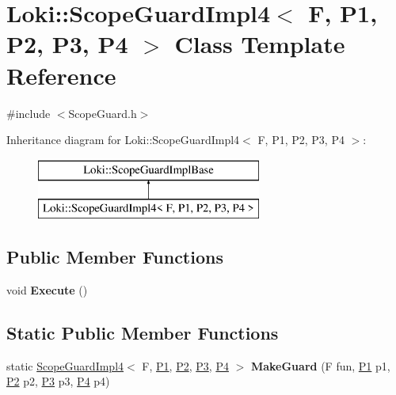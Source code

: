 \hypertarget{classLoki_1_1ScopeGuardImpl4}{}\section{Loki\+:\+:Scope\+Guard\+Impl4$<$ F, P1, P2, P3, P4 $>$ Class Template Reference}
\label{classLoki_1_1ScopeGuardImpl4}


{\ttfamily \#include $<$Scope\+Guard.\+h$>$}

Inheritance diagram for Loki\+:\+:Scope\+Guard\+Impl4$<$ F, P1, P2, P3, P4 $>$\+:\begin{figure}[H]
\begin{center}
\leavevmode
\includegraphics[height=2.000000cm]{classLoki_1_1ScopeGuardImpl4}
\end{center}
\end{figure}
\subsection*{Public Member Functions}
\begin{DoxyCompactItemize}
\item 
\hypertarget{classLoki_1_1ScopeGuardImpl4_afda12fe2bea582332b670df2ca454acc}{}void {\bfseries Execute} ()\label{classLoki_1_1ScopeGuardImpl4_afda12fe2bea582332b670df2ca454acc}

\end{DoxyCompactItemize}
\subsection*{Static Public Member Functions}
\begin{DoxyCompactItemize}
\item 
\hypertarget{classLoki_1_1ScopeGuardImpl4_a71b82547f38ed4d037e6f5866d5d7cda}{}static \hyperlink{classLoki_1_1ScopeGuardImpl4}{Scope\+Guard\+Impl4}$<$ F, \hyperlink{structP1}{P1}, \hyperlink{structP2}{P2}, \hyperlink{structP3}{P3}, \hyperlink{structP4}{P4} $>$ {\bfseries Make\+Guard} (F fun, \hyperlink{structP1}{P1} p1, \hyperlink{structP2}{P2} p2, \hyperlink{structP3}{P3} p3, \hyperlink{structP4}{P4} p4)\label{classLoki_1_1ScopeGuardImpl4_a71b82547f38ed4d037e6f5866d5d7cda}

\end{DoxyCompactItemize}
